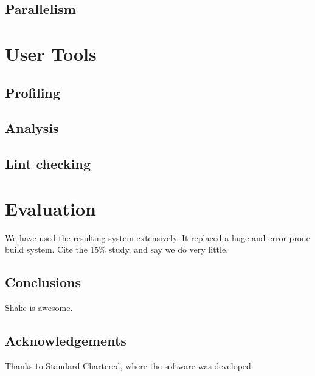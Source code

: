 \documentclass{sigplanconf}
\begin{document}
\subsection{Parallelism}

\section{User Tools}

\subsection{Profiling}

\subsection{Analysis}

\subsection{Lint checking}

\section{Evaluation}

We have used the resulting system extensively. It replaced a huge and error prone build system. Cite the 15\% study, and say we do very little.


\subsection{Conclusions}

Shake is awesome.

\subsection*{Acknowledgements}

Thanks to Standard Chartered, where the software was developed.


\balance

\end{document}
